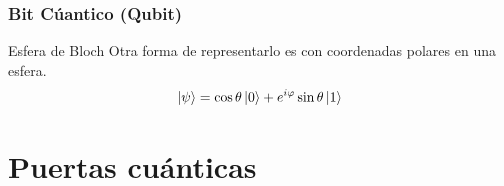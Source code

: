 \documentclass[10pt,compress]{beamer}
\begin{document}
\begin{frame}
\frametitle{Bit Cúantico (Qubit)}

\begin{block}{Esfera de Bloch}
Otra forma de representarlo es con coordenadas polares en una esfera.
\begin{equation}
\ket{\psi} = \cos \theta \ket{0} + e^{i\varphi} \sin \theta \ket{1}
\end{equation}

\end{block}

\end{frame}

\section{Puertas cuánticas}
\end{document}
